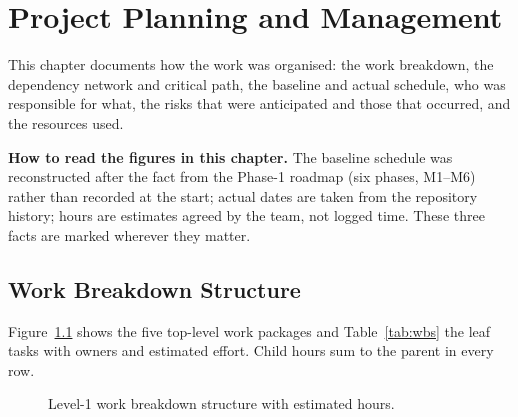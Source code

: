 \chapter{Project Planning and Management}
\label{ch:plan}

This chapter documents how the work was organised: the work breakdown, the dependency network and critical path, the baseline and actual schedule, who was responsible for what, the risks that were anticipated and those that occurred, and the resources used.

\noindent\textbf{How to read the figures in this chapter.} The baseline schedule was reconstructed after the fact from the Phase-1 roadmap (six phases, M1--M6) rather than recorded at the start; actual dates are taken from the repository history; hours are estimates agreed by the team, not logged time. These three facts are marked wherever they matter.

\section{Work Breakdown Structure}
\label{sec:wbs}

Figure~\ref{fig:wbs} shows the five top-level work packages and Table~\ref{tab:wbs} the leaf tasks with owners and estimated effort. Child hours sum to the parent in every row.

\begin{figure}[!b]
\centering
{}
\caption{Level-1 work breakdown structure with estimated hours.}
\label{fig:wbs}
\end{figure}

